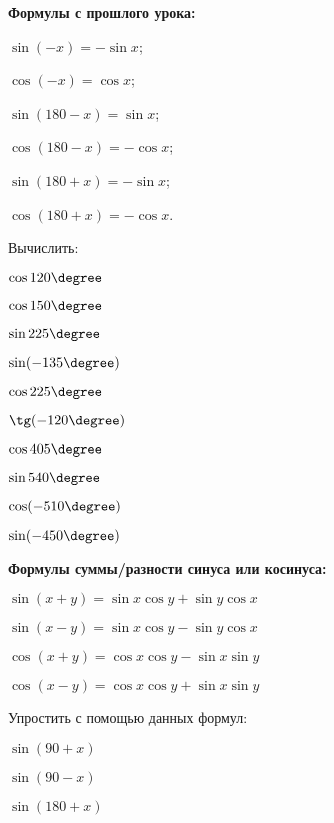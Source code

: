 \begin{class}[number=2]
	\begin{listofex}
		\item \textbf{Формулы с прошлого урока:}
		\begin{enumcols}[itemcolumns=3]
			\item \( \sin(-x) = -\sin x \);
			\item \( \cos(-x) = \cos x \);
			\item \( \sin(180 - x) = \sin x \);
			\item \( \cos(180 - x) = -\cos x \);
			\item \( \sin(180+x) = -\sin x \);
			\item \( \cos(180+x) = -\cos x \).
		\end{enumcols}
		\item Вычислить:
		\begin{enumcols}[itemcolumns=5]
			\item \( \cos120\degree \)
			\item \( \cos150\degree \)
			\item \( \sin225\degree \)
			\item \( \sin(-135\degree )\)
			\item \( \cos225\degree \)
			\item \( \tg(-120\degree) \)
			\item \( \cos405\degree \)
			\item \( \sin540\degree \)
			\item \( \cos(-510\degree) \)
			\item \( \sin(-450\degree) \)
		\end{enumcols}
		\item \textbf{Формулы суммы/разности синуса или косинуса:}
		\begin{enumcols}[itemcolumns=2]
			\item \( \sin(x+y)=\sin x\cos y + \sin y \cos x \)
			\item \( \sin(x-y)=\sin x\cos y - \sin y \cos x \)
			\item \( \cos(x+y)=\cos x \cos y - \sin x \sin y \)
			\item \( \cos(x-y)=\cos x \cos y + \sin x \sin y \)
		\end{enumcols}
		\item Упростить с помощью данных формул:
		\begin{enumcols}[itemcolumns=4]
			\item \( \sin(90+x)\)
			\item \( \sin(90-x)\)
			\item \( \sin(180+x)\)

\end{enumcols}
\end{listofex}
\end{class}
